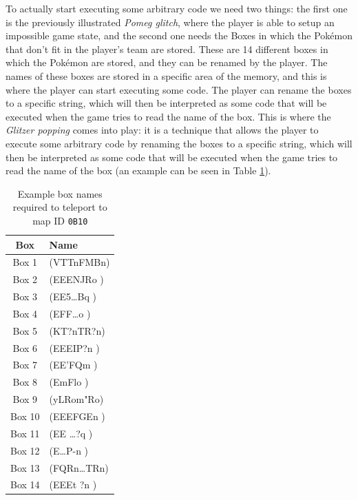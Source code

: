 \documentclass[a4paper]{usiinfbachelorproject}
\begin{document}
To actually start executing some arbitrary code we need two things: the first one is the previously illustrated \textit{Pomeg glitch}, where the player is able to setup an impossible game state, and the second one needs the Boxes in which the Pokémon that don't fit in the player's team are stored. These are 14 different boxes in which the Pokémon are stored, and they can be renamed by the player. The names of these boxes are stored in a specific area of the memory, and this is where the player can start executing some code. The player can rename the boxes to a specific string, which will then be interpreted as some code that will be executed when the game tries to read the name of the box. This is where the \textit{Glitzer popping} comes into play: it is a technique that allows the player to execute some arbitrary code by renaming the boxes to a specific string, which will then be interpreted as some code that will be executed when the game tries to read the name of the box (an example can be seen in Table \ref{tab:boxes_names}).

\begin{table}[h!]
	\centering
	\begin{tabular}{|c|l|}
		\hline
		\textbf{Box} & \textbf{Name} \\
		\hline
		Box 1        & (VTTnFMBn)    \\
		Box 2        & (EEENJRo )    \\
		Box 3        & (EE5…Bq  )    \\
		Box 4        & (EFF…o   )    \\
		Box 5        & (KT?nTR?n)    \\
		Box 6        & (EEEIP?n )    \\
		Box 7        & (EE'FQm  )    \\
		Box 8        & (EmFlo   )    \\
		Box 9        & (yLRom"Ro)    \\
		Box 10       & (EEEFGEn )    \\
		Box 11       & (EE …?q  )    \\
		Box 12       & (E…P-n   )    \\
		Box 13       & (FQRn…TRn)    \\
		Box 14       & (EEEt ?n )    \\
		\hline
	\end{tabular}
	\caption{Example box names required to teleport to map ID \texttt{0B10}}
	\label{tab:boxes_names}
\end{table}
\end{document}

